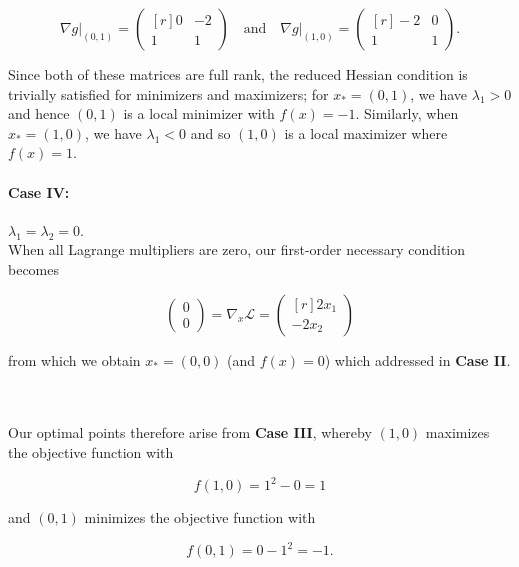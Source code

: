 \begin{solution}
    $$
    \nabla g \Big|_{(0, 1)} = \begin{pmatrix*}[r]
        0 & -2 \\
        1 &  1
    \end{pmatrix*} \quad \text{and} \quad \nabla g \Big|_{(1, 0)} = \begin{pmatrix*}[r]
       -2 &  0 \\
        1 &  1
    \end{pmatrix*}.
    $$
    
    Since both of these matrices are full rank, the reduced Hessian condition is trivially satisfied for minimizers and
    maximizers; for $x_* = (0, 1)$, we have $\lambda_1 > 0$ and hence $(0, 1)$ is a local minimizer with $f(x) = -1$. 
    Similarly, when $x_* = (1, 0)$, we have $\lambda_1 < 0$ and so $(1, 0)$ is a local maximizer where $f(x) = 1$.

    \paragraph{Case IV:} $\lambda_1 = \lambda_2 = 0.$ \ \\
    When all Lagrange multipliers are zero, our first-order necessary condition becomes

    $$
    \begin{pmatrix*}
        0 \\
        0
    \end{pmatrix*} = \nabla_x \mathcal{L} = \begin{pmatrix*}[r]
        2 x_1 \\
       -2 x_2
    \end{pmatrix*}
    $$

    from which we obtain $x_* = (0, 0)$ (and $f(x) = 0$) which addressed in \textbf{Case II}.

    \ \\\\
    Our optimal points therefore arise from \textbf{Case III}, whereby $(1, 0)$ maximizes the objective function with 

    $$
    f(1, 0) = 1^2 - 0 = 1
    $$

    and $(0, 1)$ minimizes the objective function with 
    
    $$
    f(0, 1) = 0 - 1^2 = -1.
    $$
    \ \\
\end{solution}